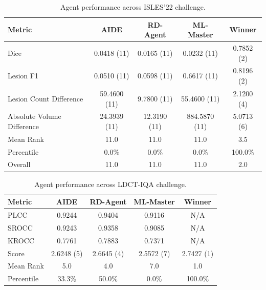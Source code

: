 \begin{table}[htbp]
\centering
\small
\caption{Agent performance across ISLES'22 challenge.}
\vspace{3pt} \label{tab:isles22}
\begin{tabular}{lcccc}
\toprule
\textbf{Metric} & \textbf{AIDE} & \textbf{RD-Agent} & \textbf{ML-Master} & \textbf{Winner} \\
\midrule
Dice & 0.0418 (11) & 0.0165 (11) & 0.0232 (11) & 0.7852 (2) \\
Lesion F1 & 0.0510 (11) & 0.0598 (11) & 0.6617 (11) & 0.8196 (2) \\
Lesion Count Difference & 59.4600 (11) & 9.7800 (11) & 55.4600 (11) & 2.1200 (4) \\
Absolute Volume Difference & 24.3939 (11) & 12.3190 (11) & 884.5870 (11) & 5.0713 (6) \\
\midrule
Mean Rank & 11.0 & 11.0 & 11.0 & 3.5 \\
Percentile & 0.0\% & 0.0\% & 0.0\% & 100.0\% \\
Overall & 11.0 & 11.0 & 11.0 & 2.0 \\
\bottomrule
\end{tabular}
\end{table}

\begin{table}[htbp]
\centering
\small
\caption{Agent performance across LDCT-IQA challenge.}
\vspace{3pt} \label{tab:ldct-iqa}
\begin{tabular}{lcccc}
\toprule
\textbf{Metric} & \textbf{AIDE} & \textbf{RD-Agent} & \textbf{ML-Master} & \textbf{Winner} \\
\midrule
PLCC & 0.9244 & 0.9404 & 0.9116 & N/A \\
SROCC & 0.9243 & 0.9358 & 0.9085 & N/A \\
KROCC & 0.7761 & 0.7883 & 0.7371 & N/A \\
Score & 2.6248 (5) & 2.6645 (4) & 2.5572 (7) & 2.7427 (1) \\
\midrule
Mean Rank & 5.0 & 4.0 & 7.0 & 1.0 \\
Percentile & 33.3\% & 50.0\% & 0.0\% & 100.0\% \\
\bottomrule
\end{tabular}
\end{table}

